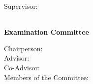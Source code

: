 \begin{titlepage}
\begin{center}
\begin{minipage}[t]{.5\textwidth}
  \begin{flushright}
    {\large Supervisor:\:}
  \end{flushright}
\end{minipage}%
\begin{minipage}[t]{.5\textwidth}
  \begin{flushleft}
    {\Supervisors}
  \end{flushleft}
\end{minipage}\\
%
\if{}
  \vspace*{\finalAdvisorsSpacing}
\else
  \vspace*{\draftAdvisorsSpacing}
\fi
\if{}
%
{\Large \textbf{Examination Committee}}\\[.25cm]
\begin{minipage}[t]{.5\textwidth}
  \begin{flushright}
    \if{}
    {\large Chairperson:\:}\\
    \fi
    {\large Advisor:\:}\\
    \if{}
    {\large Co-Advisor:}\\
    \fi
    \if{}
    {\large Members of the Committee:\:}
    \fi
  \end{flushright}
\end{minipage}%
\begin{minipage}[t]{.5\textwidth}
  \begin{flushleft}
    \if{}
    {\Chairperson}\\
    \fi
    {\Advisor}\\
    \if{}
    {\CoAdvisor}\\
    \fi
    \if{}
    {\CommitteeMembers}
    \fi
  \end{flushleft}
\end{minipage}\\[1.0cm]
%
\fi

\if{}
 \vspace*{\dateSpacing}
\fi

{\Large \textbf{\Month\:\Year}}\\
\end{center}
\end{titlepage}

